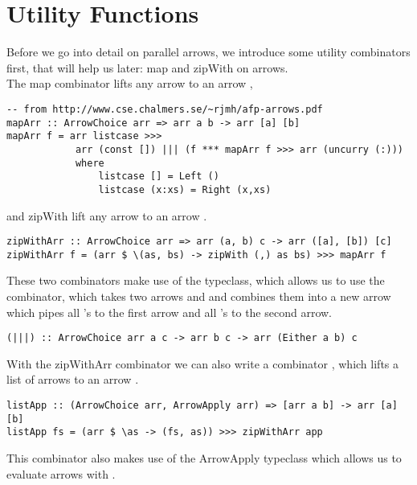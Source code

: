 \section{Utility Functions}\label{utilfns}
Before we go into detail on parallel arrows, we introduce some utility combinators first, that will help us later: map and zipWith on arrows.
\\
The map combinator lifts any arrow  to an arrow ,
\begin{lstlisting}[frame=htrbl]
-- from http://www.cse.chalmers.se/~rjmh/afp-arrows.pdf
mapArr :: ArrowChoice arr => arr a b -> arr [a] [b]
mapArr f = arr listcase >>>
			arr (const []) ||| (f *** mapArr f >>> arr (uncurry (:)))
			where
				listcase [] = Left ()
				listcase (x:xs) = Right (x,xs)
\end{lstlisting}
and zipWith lift any arrow  to an arrow .
\begin{lstlisting}[frame=htrbl]
zipWithArr :: ArrowChoice arr => arr (a, b) c -> arr ([a], [b]) [c]
zipWithArr f = (arr $ \(as, bs) -> zipWith (,) as bs) >>> mapArr f
\end{lstlisting}
These two combinators make use of the  typeclass, which allows us to use the \code{|||} combinator, which takes two arrows  and  and combines them into a new arrow  which pipes all 's to the first arrow and all 's to the second arrow.
\begin{lstlisting}[frame=htrbl]
(|||) :: ArrowChoice arr a c -> arr b c -> arr (Either a b) c
\end{lstlisting}
With the zipWithArr combinator we can also write a combinator , which lifts a list of arrows \code{[arr a b]} to an arrow .
\begin{lstlisting}[frame=htrbl]
listApp :: (ArrowChoice arr, ArrowApply arr) => [arr a b] -> arr [a] [b]
listApp fs = (arr $ \as -> (fs, as)) >>> zipWithArr app
\end{lstlisting}
This combinator also makes use of the ArrowApply typeclass which allows us to evaluate arrows with .
\\

